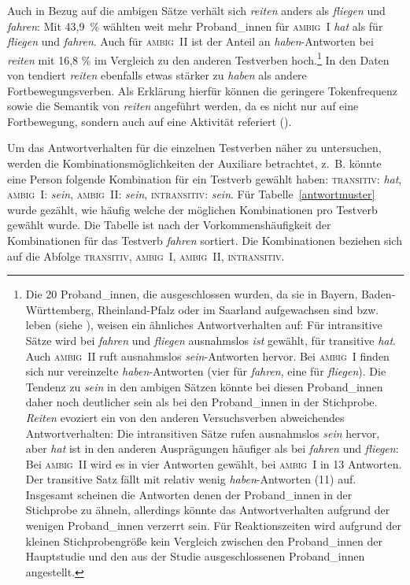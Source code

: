 Auch in Bezug auf die ambigen Sätze verhält sich \textit{reiten} anders als \textit{fliegen} und \textit{fahren}: Mit 43,9~\% wählten weit mehr Proband\_innen für \textsc{ambig~I} \textit{hat} als für \textit{fliegen} und \textit{fahren}. Auch für \textsc{ambig~II} ist der Anteil an \textit{haben}-Antworten bei \textit{reiten} mit 16,8 \% im Vergleich zu den anderen Testverben hoch.\footnote{Die 20 Proband\_innen, die ausgeschlossen wurden, da sie in Bayern, Baden-Württemberg, Rheinland-Pfalz oder im Saarland aufgewachsen sind bzw. leben (siehe ), weisen ein ähnliches Antwortverhalten auf: Für intransitive Sätze wird bei \textit{fahren} und \textit{fliegen} ausnahmslos \textit{ist} gewählt, für transitive \textit{hat}. Auch \textsc{ambig~II} ruft ausnahmslos \textit{sein}-Antworten hervor. Bei \textsc{ambig~I} finden sich nur vereinzelte \textit{haben}-Antworten (vier für \textit{fahren}, eine für \textit{fliegen}). Die Tendenz zu \textit{sein} in den ambigen Sätzen könnte bei diesen Proband\_innen  daher noch deutlicher sein als bei den Proband\_innen in der Stichprobe. \textit{Reiten} evoziert ein von den anderen Versuchsverben abweichendes Antwortverhalten: Die intransitiven Sätze rufen ausnahmslos \textit{sein} hervor, aber \textit{hat} ist in den anderen Ausprägungen häufiger als bei \textit{fahren} und \textit{fliegen}: Bei \textsc{ambig~II} wird es in vier Antworten gewählt, bei \textsc{ambig~I} in 13 Antworten. Der transitive Satz fällt mit relativ wenig \textit{haben}-Antworten (11) auf. Insgesamt scheinen die Antworten denen der Proband\_innen in der Stichprobe zu ähneln, allerdings könnte das Antwortverhalten aufgrund der wenigen Proband\_innen verzerrt sein. Für Reaktionszeiten wird aufgrund der kleinen Stichprobengröße kein Vergleich zwischen den Proband\_innen der Hauptstudie und den aus der Studie ausgeschlossenen Proband\_innen angestellt.} In den Daten von \textcite{Gillmann.2016} tendiert \textit{reiten} ebenfalls etwas stärker zu \textit{haben} als andere Fortbewegungsverben. Als Erklärung hierfür können die geringere Tokenfrequenz sowie die Semantik von \textit{reiten} angeführt werden, da es nicht nur auf eine Fortbewegung, sondern auch auf eine Aktivität referiert (\cite[273--280]{Gillmann.2016}). 

Um das Antwortverhalten für die einzelnen Testverben näher zu untersuchen, werden die Kombinationsmöglichkeiten der Auxiliare betrachtet, z.~B. könnte eine Person folgende Kombination für ein Testverb gewählt haben: \textsc{transitiv}: \textit{hat}, \textsc{ambig~I}: \textit{sein}, \textsc{ambig~II}: \textit{sein}, \textsc{intransitiv}: \textit{sein}. Für Tabelle~\ref{antwortmuster} wurde gezählt, wie häufig welche der möglichen Kombinationen pro Testverb gewählt wurde. Die Tabelle ist nach der Vorkommenshäufigkeit der Kombinationen für das Testverb \textit{fahren} sortiert.  Die Kombinationen beziehen sich auf die Abfolge \textsc{transitiv}, \textsc{ambig~I}, \textsc{ambig~II}, \textsc{intransitiv}.


